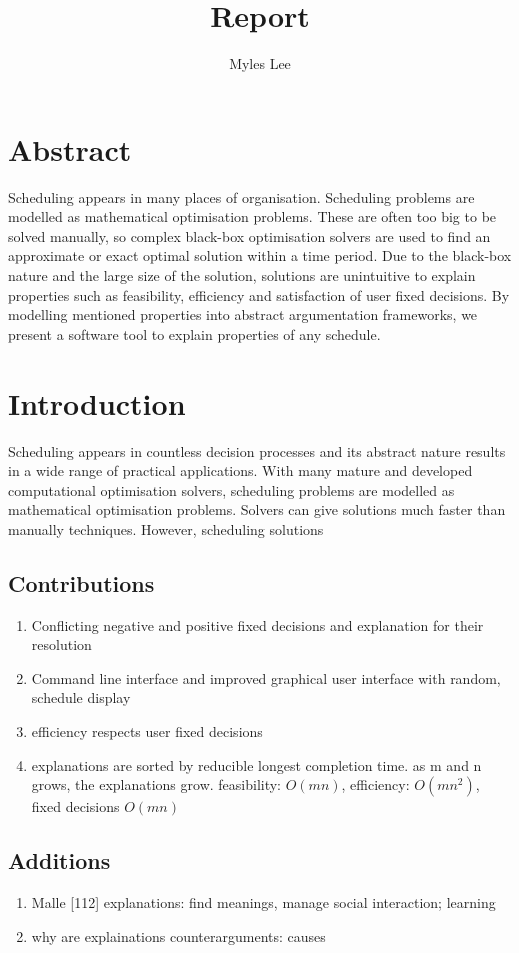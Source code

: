 \documentclass[10pt,a4paper]{article}
\author{Myles Lee}
\title{Report}
\begin{document}
	\maketitle
	
	\section*{Abstract}
	
	Scheduling appears in many places of organisation. Scheduling problems are modelled as mathematical optimisation problems. These are often too big to be solved manually, so complex black-box optimisation solvers are used to find an approximate or exact optimal solution within a time period. Due to the black-box nature and the large size of the solution, solutions are unintuitive to explain properties such as feasibility, efficiency and satisfaction of user fixed decisions. By modelling mentioned properties into abstract argumentation frameworks, we present a software tool to explain properties of any schedule.
	
	\section*{Introduction}
	
	Scheduling appears in countless decision processes and its abstract nature results in a wide range of practical applications. With many mature and developed computational optimisation solvers, scheduling problems are modelled as  mathematical optimisation problems. Solvers can give solutions much faster than manually techniques. However, scheduling solutions
	
	\subsection*{Contributions}
	\begin{enumerate}
		\item Conflicting negative and positive fixed decisions and explanation for their resolution
		\item Command line interface and improved graphical user interface with random, schedule display
		\item efficiency respects user fixed decisions
		\item explanations are sorted by reducible longest completion time. as m and n grows, the explanations grow. feasibility: $O(mn)$, efficiency: $O(mn^2)$, fixed decisions $O(mn)$
	\end{enumerate}

	\subsection*{Additions}
	\begin{enumerate}
		\item Malle [112] explanations: find meanings, manage social interaction; learning
		\item why are explainations counterarguments: causes
	\end{enumerate}
\end{document}
